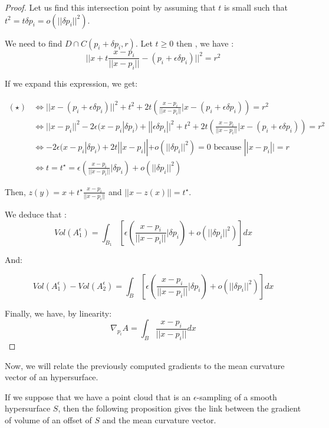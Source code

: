 \begin{proof}
Let us find this intersection point by assuming that $ t $ is small
such that $ t^2 = t \delta p_i = o(||\delta p_i||^2) $.

We need to find $ D \cap C(p_i + \delta p_i, r) $. Let $ t \ge 0 $ then , we have :
\begin{equation}
    || x + t \frac{x - p_i}{||x - p_i||} - (p_i + \epsilon \delta p_i) ||^2 = r^2
    \tag{$\star$}
\end{equation}

If we expand this expression, we get:

\begin{align*}
    (\star) & \iff || x - (p_i + \epsilon \delta p_i) ||^2 + t^2 + 2t \left(
        \frac{x-p_i}{|| x - p_i||} | x - (p_i + \epsilon \delta p_i) \right) = r^2 \\
    & \iff || x - p_i || ^2 - 2 \epsilon (x - p_i | \delta p_i) + || \epsilon \delta p_i || ^2 + t^2 + 2t
    \left( \frac{x-p_i}{|| x - p_i||} | x - (p_i + \epsilon \delta p_i) \right) = r^2 \\
    & \iff -2 \epsilon (x - p_i | \delta p_i) + 2t || x - p_i|| + o(||\delta p_i||^2) = 0
    \text{ because } || x - p_i || = r \\
    & \iff t = t^{\star} = \epsilon \left( \frac{x - p_i}{||x - p_i||} | \delta p_i \right) +
    o(||\delta p_i||^2)
\end{align*}

Then, $ z(y) = x + t^{\star} \frac{x - p_i}{||x - p_i||} $ and $ || x - z(x) || =
t^{\star} $.

We deduce that :
$$ Vol(A_1^\epsilon) = \int_{B_1} \left[ \epsilon \left( \frac{x - p_i}{||x - p_i||} | \delta p_i \right) +
o(||\delta p_i||^2) \right] dx $$

And:

$$ Vol(A_1^\epsilon) - Vol(A_2^\epsilon) = \int_{B} \left[ \epsilon \left( \frac{x - p_i}{||x - p_i||} | \delta p_i \right)
+ o(||\delta p_i||^2) \right] dx $$

Finally, we have, by linearity:
$$ \nabla_{p_i} A = \int_{B} \frac{x - p_i}{||x - p_i||} dx $$

\end{proof}

Now, we will relate the previously computed gradients to the mean curvature
vector of an hypersurface.

If we suppose that we have a point cloud that is an $\epsilon$-sampling of a
smooth hypersurface $ S $, then the following proposition gives the link between
the gradient of volume of an offset of $ S $ and the mean curvature vector.

